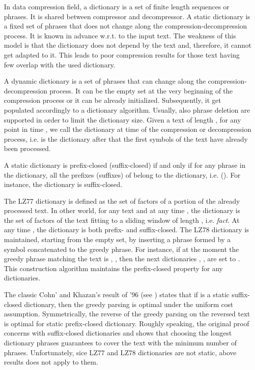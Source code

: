 \documentclass[12pt]{article}
\theoremstyle{plain}
\theoremstyle{definition}
\theoremstyle{remark}
\begin{document}
In data compression field, a dictionary is a set of finite length sequences or phrases. It is shared between compressor and decompressor. A static dictionary is a fixed set of phrases that does not change along the compression-decompression process. It is known in advance w.r.t. to the input text. The weakness of this model is that the dictionary does not depend by the text and, therefore, it cannot get adapted to it. This leads to poor compression results for those text having few overlap with the used dictionary.

A dynamic dictionary is a set of phrases that can change along the compression-decompression process. It can be the empty set at the very beginning of the compression process or it can be already initialized. Subsequently, it get populated accordingly to a dictionary algorithm. Usually, also phrase deletion are supported in order to limit the dictionary size. Given a text  of length , for any point in time , we call  the dictionary 
at time  of the compression or decompression process, i.e.  is the dictionary after that the first  symbols of the text have already been processed.

A static dictionary  is prefix-closed (suffix-closed) if and only if for any phrase  in the dictionary, all the prefixes (suffixes) of  belong to the dictionary, i.e.  ().  
For instance, the dictionary  is suffix-closed.

The LZ77 dictionary is defined as the set of factors of a portion of the already processed text. In other world, for any text  and at any time , the dictionary is the set of factors of the text fitting to a sliding window of length , i.e.  \emph{fact}. At any time , the dictionary  is both prefix- and suffix-closed. 
The LZ78 dictionary is maintained, starting from the empty set, by inserting a phrase formed by a symbol concatenated to the greedy phrase. For instance, if at the moment  the greedy phrase matching the text is , , then the next dictionaries , , are set to . This construction algorithm maintains the prefix-closed property for any  dictionaries.

The classic Cohn' and Khazan's result of '96 (see \cite{DBLP:conf/dcc/CohnK96}) states that if  is a static suffix-closed dictionary, then the greedy parsing is optimal under the uniform cost assumption. 
Symmetrically, the reverse of the greedy parsing on the reversed text is optimal for static prefix-closed dictionary. Roughly speaking, the original proof concerns with suffix-closed dictionaries and shows that choosing the longest dictionary phrases guarantees to cover the text with the minimum number of phrases. 
Unfortunately, sice LZ77 and LZ78 dictionaries are not static, above results does not apply to them. 
\end{document}
